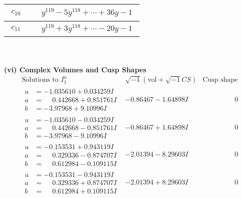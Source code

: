 \documentclass[1p]{elsarticle_modified}
\theoremstyle{definition}
\newcommand{\I}{\sqrt{-1}}
\begin{document}
\begin{tabular}{m{50pt}|m{274pt}}
\hline $$\begin{aligned}c_{10}\end{aligned}$$&$\begin{aligned}
&y^{119}-5 y^{118}+\cdots+36 y-1
\end{aligned}$\\
\hline $$\begin{aligned}c_{11}\end{aligned}$$&$\begin{aligned}
&y^{119}+3 y^{118}+\cdots-20 y-1
\end{aligned}$\\
\hline
\end{tabular}\\~\\
\newpage\flushleft \textbf{(vi) Complex Volumes and Cusp Shapes}
$$\begin{array}{c|c|c}  
\text{Solutions to }I^u_{1}& \I (\text{vol} + \sqrt{-1}CS) & \text{Cusp shape}\\
 \hline 
\begin{aligned}
u &= -1.035610 + 0.034259 I \\
a &= \phantom{-}0.442668 + 0.851761 I \\
b &= -3.97968 + 9.10996 I\end{aligned}
 & -0.86467 - 1.64898 I & \phantom{-0.000000 } 0 \\ \hline\begin{aligned}
u &= -1.035610 - 0.034259 I \\
a &= \phantom{-}0.442668 - 0.851761 I \\
b &= -3.97968 - 9.10996 I\end{aligned}
 & -0.86467 + 1.64898 I & \phantom{-0.000000 } 0 \\ \hline\begin{aligned}
u &= -0.153531 + 0.943119 I \\
a &= \phantom{-}0.329336 - 0.874707 I \\
b &= \phantom{-}0.612984 - 0.109115 I\end{aligned}
 & -2.01394 - 8.29603 I & \phantom{-0.000000 } 0 \\ \hline\begin{aligned}
u &= -0.153531 - 0.943119 I \\
a &= \phantom{-}0.329336 + 0.874707 I \\
b &= \phantom{-}0.612984 + 0.109115 I\end{aligned}
 & -2.01394 + 8.29603 I & \phantom{-0.000000 } 0 \\ \hline\begin{aligned}

\end{aligned}
\end{array}$$
\end{document}
